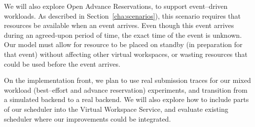 We will also explore Open Advance Reservations, to support event--driven workloads. As described in Section~\ref{cha:scenarios}), this scenario requires that resources be available when an event arrives. Even though this event arrives during an agreed-upon period of time, the exact time of the event is unknown. Our model must allow for resource to be placed on standby (in preparation for that event) without affecting other virtual workspaces, or wasting resources that could be used before the event arrives.

On the implementation front, we plan to use real submission traces for our mixed workload (best--effort and advance reservation) experiments, and transition from a simulated backend to a real backend. We will also explore how to include parts of our scheduler into the Virtual Workspace Service, and evaluate existing scheduler where our improvements could be integrated.